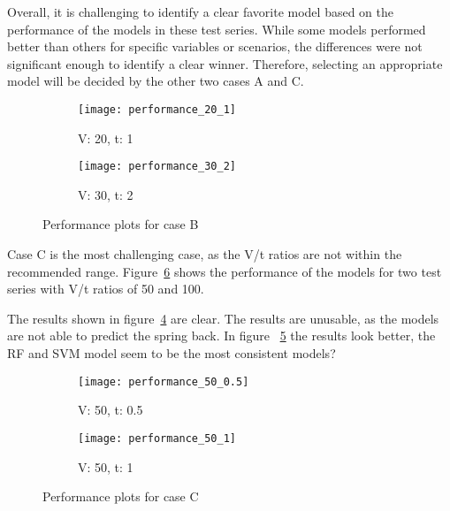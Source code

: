 Overall, it is challenging to identify a clear favorite model based on the performance of the
models in these test series.
While some models performed better than others for specific variables or scenarios, the
differences were not significant enough to identify a clear winner.
Therefore, selecting an appropriate model will be decided by the other two cases A and C.

\begin{figure}[H]
    \begin{tcolorbox}[arc=0pt,boxrule=0.5pt]
        \begin{subfigure}{0.5\textwidth}
            \texttt{[image: performance\_20\_1]}
            \caption{V: 20, t: 1}
            \label{fig:performance-20-1}
        \end{subfigure}
        \hfill
        \begin{subfigure}{0.5\textwidth}
            \texttt{[image: performance\_30\_2]}
            \caption{V: 30, t: 2}
            \label{fig:performance-30_2.0}
        \end{subfigure}
    \end{tcolorbox}
    \caption{Performance plots for case B}
    \label{fig:performance-case-b}
\end{figure}

Case C is the most challenging case, as the V/t ratios are not within the recommended range.
Figure~\ref{fig:performance-case-c} shows the performance of the models for two test series
with V/t ratios of 50 and 100.

The results shown in figure~\ref{fig:performance-50_0.5} are clear.
The results are unusable, as the models are not able to predict the spring back.
In figure ~\ref{fig:performance-50_1} the results look better, the \ac{RF} and \ac{SVM} model
seem to be the most consistent models?

\begin{figure}[H]
    \begin{tcolorbox}[arc=0pt,boxrule=0.5pt]
        \begin{subfigure}{0.5\textwidth}
            \texttt{[image: performance\_50\_0.5]}
            \caption{V: 50, t: 0.5}
            \label{fig:performance-50_0.5}
        \end{subfigure}
        \hfill
        \begin{subfigure}{0.5\textwidth}
            \texttt{[image: performance\_50\_1]}
            \caption{V: 50, t: 1}
            \label{fig:performance-50_1}
        \end{subfigure}
    \end{tcolorbox}
    \caption{Performance plots for case C}
    \label{fig:performance-case-c}
\end{figure}

